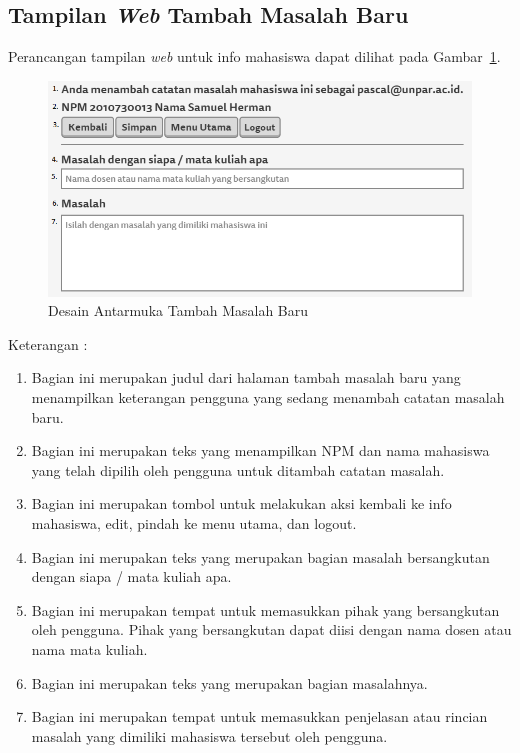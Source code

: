 \subsection{Tampilan {\it Web} Tambah Masalah Baru}
Perancangan tampilan {\it web} untuk info mahasiswa dapat dilihat pada Gambar~\ref{fig:masalahbaru}.
\begin{figure}[ht]
\centering
\includegraphics[scale=0.8]{Gambar/masalahbaru.png}
\caption[Desain Antarmuka Tambah Masalah Baru]{Desain Antarmuka Tambah Masalah Baru}
\label{fig:masalahbaru}
\end{figure}

Keterangan :
\begin{enumerate}[(1)]
\item
Bagian ini merupakan judul dari halaman tambah masalah baru yang menampilkan keterangan pengguna yang sedang menambah catatan masalah baru.
\item
Bagian ini merupakan teks yang menampilkan NPM dan nama mahasiswa yang telah dipilih oleh pengguna untuk ditambah catatan masalah.
\item
Bagian ini merupakan tombol untuk melakukan aksi kembali ke info mahasiswa, edit, pindah ke menu utama, dan logout.
\item
Bagian ini merupakan teks yang merupakan bagian masalah bersangkutan dengan siapa / mata kuliah apa.
\item
Bagian ini merupakan tempat untuk memasukkan pihak yang bersangkutan oleh pengguna. Pihak yang bersangkutan dapat diisi dengan nama dosen atau nama mata kuliah.
\item
Bagian ini merupakan teks yang merupakan bagian masalahnya.
\item
Bagian ini merupakan tempat untuk memasukkan penjelasan atau rincian masalah yang dimiliki mahasiswa tersebut oleh pengguna.
\end{enumerate}

